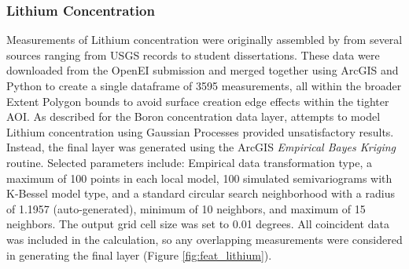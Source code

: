\subsubsection{Lithium Concentration}

Measurements of Lithium concentration were originally assembled by \citet{bielicki_hydrogeolgic_2015} from several sources ranging from USGS records to student dissertations. These data were downloaded from the OpenEI submission \citep{kelley_geothermal_2015} and merged together using ArcGIS and Python to create a single dataframe of 3595 measurements, all within the broader Extent Polygon bounds to avoid surface creation edge effects within the tighter AOI. As described for the Boron concentration data layer, attempts to model Lithium concentration using Gaussian Processes provided unsatisfactory results. Instead, the final layer was generated using the ArcGIS \textit{Empirical Bayes Kriging} routine. Selected parameters include: Empirical data transformation type, a maximum of 100 points in each local model, 100 simulated semivariograms with K-Bessel model type, and a standard circular search neighborhood with a radius of 1.1957 (auto-generated), minimum of 10 neighbors, and maximum of 15 neighbors. The output grid cell size was set to 0.01 degrees. All coincident data was included in the calculation, so any overlapping measurements were considered in generating the final layer (Figure \ref{fig:feat_lithium}).

